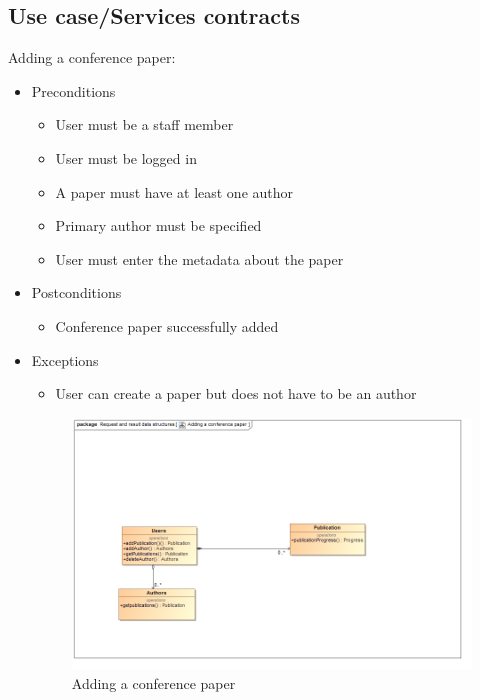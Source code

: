 \documentclass[a4paper,12pt]{article}
\begin{document}
\newpage
\subsection{Use case/Services contracts}
Adding a conference paper:
\begin{itemize}
    \item Preconditions
    \begin{itemize}
        \item User must be a staff member
        \item User must be logged in
        \item A paper must have at least one author
         \item Primary author must be specified
        \item User must enter the metadata about the paper
    \end{itemize}
    \item Postconditions
    \begin{itemize}
        \item Conference paper successfully added
    \end{itemize}
    \item Exceptions
    \begin{itemize}
        \item User can create a paper but does not have to be an author
    \end{itemize}
    
    \begin{figure}[H]
    \centering
    \caption{Adding a conference paper}
    \includegraphics[width=1\textwidth]{use-case/adding-a-conference-paper.png}
    \end{figure}
\end{itemize}
\end{document}
